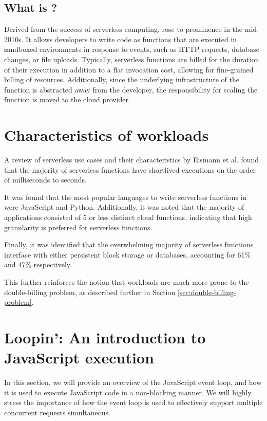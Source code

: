 \subsection{What is \faas{}?}
Derived from the success of serverless computing, \faas{} rose to prominence in the mid-2010s\cite{AmazonWebServices2014,azureAnnouncingGeneralAvailability2016}. It allows developers to write code as functions that are executed in sandboxed environments in response to events, such as HTTP requests, database changes, or file uploads\cite{EventarcOverview,EventListenerAmazon,robeceOverviewAzureEvent2024}. Typically, serverless functions are billed for the duration of their execution in addition to a flat invocation cost, allowing for fine-grained billing of resources\cite{bortoliniInvestigatingPerformanceCost2020}. Additionally, since the underlying infrastructure of the function is abstracted away from the developer, the responsibility for scaling the function is moved to the cloud provider.

\section{Characteristics of \faas{} workloads}
A review of serverless use cases and their characteristics by Eismann et al.\cite{eismannReviewServerlessUse2020} found that the majority of serverless functions have shortlived executions on the order of milliseconds to seconds.

It was found that the most popular languages to write serverless functions in were JavaScript and Python. Additionally, it was noted that the majority of applications consisted of 5 or less distinct cloud functions, indicating that high granularity is preferred for serverless functions.

Finally, it was identified that the overwhelming majority of serverless functions interface with either persistent block storage or databases, accounting for 61\% and 47\% respectively.

This further reinforces the notion that \faas{} workloads are much more prone to the double-billing problem, as described further in Section \ref{sec:double-billing-problem}.

\section{Loopin': An introduction to JavaScript execution}
\label{sec:js-event-loop}
In this section, we will provide an overview of the JavaScript event loop, and how it is used to execute JavaScript code in a non-blocking manner. We will highly stress the importance of how the \js{} event loop is used to effectively support multiple concurrent requests simultaneous.

